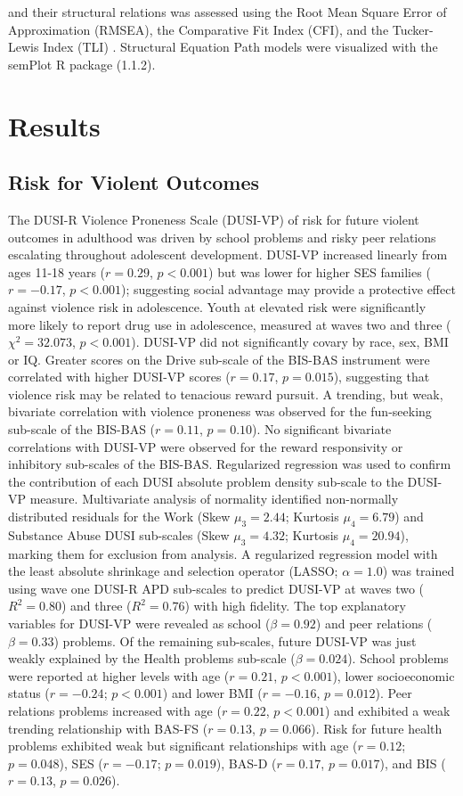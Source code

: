 \documentclass[utf8]{article}
\begin{document}
and their structural relations was assessed using the Root Mean Square Error of Approximation (RMSEA), the Comparative Fit Index (CFI), and the Tucker-Lewis Index (TLI) \citep{KennyEtAl2015,HuTzeBentler1999, wu2009evaluating}. Structural Equation Path models were visualized with the semPlot R package (1.1.2). 
\section*{Results} 
\subsection*{Risk for Violent Outcomes} The DUSI-R Violence Proneness Scale (DUSI-VP) of risk for future violent outcomes in adulthood was driven by school problems and risky peer relations escalating throughout adolescent development. DUSI-VP increased linearly from ages 11-18 years ($r=0.29$,  $p<0.001$) but was lower for higher SES families ($r=-0.17$, $p<0.001$); suggesting social advantage may provide a protective effect against violence risk in adolescence. Youth at elevated risk were significantly more likely to report drug use in adolescence, measured at waves two and three ($\chi^2 = 32.073$, $p<0.001$). DUSI-VP did not significantly covary by race, sex, BMI or IQ. Greater scores on the Drive sub-scale of the BIS-BAS instrument were correlated with higher DUSI-VP scores ($r=0.17$, $p=0.015$), suggesting that violence risk may be related to tenacious reward pursuit. A trending, but weak, bivariate correlation with violence proneness was observed for the fun-seeking sub-scale of the BIS-BAS ($r=0.11$, $p=0.10$). No significant bivariate correlations with DUSI-VP were observed for the reward responsivity or inhibitory sub-scales of the BIS-BAS. Regularized regression was used to confirm the contribution of each DUSI absolute problem density sub-scale to the DUSI-VP measure. Multivariate analysis of normality identified non-normally distributed residuals for the Work (Skew $\mu_3=2.44$; Kurtosis $\mu_4=6.79$) and Substance Abuse DUSI sub-scales (Skew $\mu_3=4.32$; Kurtosis $\mu_4=20.94$), marking them for exclusion from analysis. A regularized regression model with the least absolute shrinkage and selection operator (LASSO; $\alpha=1.0$) was trained using wave one DUSI-R APD sub-scales to predict DUSI-VP at waves two ($R^2=0.80$) and three ($R^2=0.76$) with high fidelity. The top explanatory variables for DUSI-VP were revealed as school ($\beta=0.92$) and peer relations ($\beta=0.33$) problems. Of the remaining sub-scales, future DUSI-VP was just weakly explained by the Health problems sub-scale ($\beta=0.024$). School problems were reported at higher levels with age ($r=0.21$, $p<0.001$), lower socioeconomic status ($r=-0.24$; $p<0.001$) and lower BMI ($r=-0.16$, $p=0.012$). Peer relations problems increased with age ($r=0.22$, $p<0.001$) and exhibited a weak trending relationship with BAS-FS ($r=0.13$, $p=0.066$). Risk for future health problems exhibited weak but significant relationships with age ($r=0.12$; $p=0.048$), SES ($r=-0.17$; $p=0.019$), BAS-D ($r=0.17$, $p=0.017$), and BIS ($r=0.13$, $p=0.026$). 
%
\vspace{20pt}
\end{document}
